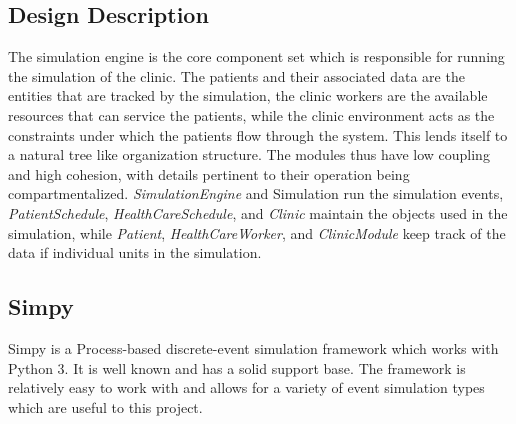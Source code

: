 \documentclass[12pt]{article}
\begin{document}
\subsection{Design Description}
The simulation engine is the core component set which is responsible for running the simulation of the clinic. The patients and their associated data are the entities that are tracked by the simulation, the clinic workers are the available resources that can service the patients, while the clinic environment acts as the constraints under which the patients flow through the system. This lends itself to a natural tree like organization structure. The modules thus have low coupling and high cohesion, with details pertinent to their operation being compartmentalized. \textit{SimulationEngine} and Simulation run the simulation events, \textit{PatientSchedule},\textit{ HealthCareSchedule}, and \textit{Clinic} maintain the objects used in the simulation, while \textit{Patient}, \textit{HealthCareWorker}, and \textit{ClinicModule} keep track of the data if individual units in the simulation.

\subsection{Simpy}
Simpy is a Process-based discrete-event simulation framework which works with Python 3. It is well known and has a solid support base. The framework is relatively easy to work with and allows for a variety of event simulation types which are useful to this project. 

\begin{figure}[H]
\centering
\end{figure}
\end{document}
